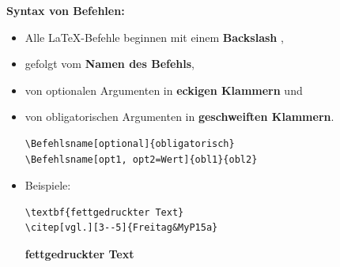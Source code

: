 \begin{frame}[fragile]

\textbf{Syntax von Befehlen:}

\pause

\begin{itemize}
	\item Alle \LaTeX -Befehle beginnen mit einem \textbf{Backslash} \gqq{\textbackslash}, 
	
	\item gefolgt vom \textbf{Namen des Befehls}, 
	
	\item von optionalen Argumenten in \textbf{eckigen Klammern} und 
	
	\item von obligatorischen Argumenten in \textbf{geschweiften Klammern}.

		
\begin{lstlisting}
\Befehlsname[optional]{obligatorisch} 
\Befehlsname[opt1, opt2=Wert]{obl1}{obl2}
\end{lstlisting}

\pause 
	
	\item Beispiele:
		
\begin{lstlisting}
\textbf{fettgedruckter Text} 
\citep[vgl.][3--5]{Freitag&MyP15a}
\end{lstlisting}

\pause 
	
	\ea \textbf{fettgedruckter Text} 
	\ex \citep[vgl.][3--5]{Freitag&MyP15a}
	\z 
\end{itemize}

\end{frame}



